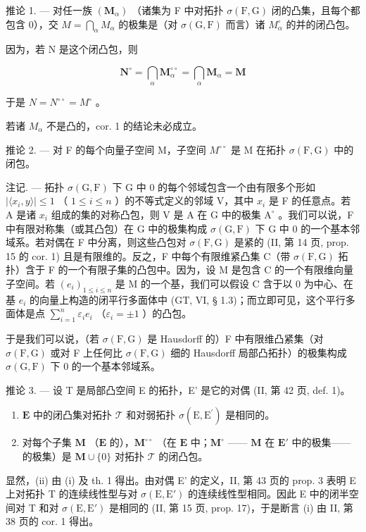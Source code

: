 推论 1. --- 对任一族 \((\mathbf{M}_{\alpha})\) （诸集为 F 中对拓扑 \(\sigma(\mathrm{F}, \mathrm{G})\) 闭的凸集，且每个都包含 0），交 \(M = \bigcap_{\alpha} M_{\alpha}\) 的极集是（对 \(\sigma(\mathrm{G}, \mathrm{F})\) 而言）诸 \(M_{\alpha}^{\circ}\) 的并的闭凸包。

因为，若 N 是这个闭凸包，则

\[
\mathbf {N} ^ {\circ} = \bigcap_ {\alpha} \mathbf {M} _ {\alpha} ^ {\circ \circ} = \bigcap_ {\alpha} \mathbf {M} _ {\alpha} = \mathbf {M}
\]

于是 \(N = N^{\circ\circ} = M^{\circ}\) 。

若诸 \(M_{\alpha}\) 不是凸的，cor. 1 的结论未必成立。

推论 2. --- 对 F 的每个向量子空间 M，子空间 \(M^{\circ\circ}\) 是 M 在拓扑 \(\sigma(\mathrm{F}, \mathrm{G})\) 中的闭包。

注记. --- 拓扑 \(\sigma(\mathrm{G},\mathrm{F})\) 下 G 中 0 的每个邻域包含一个由有限多个形如 \(|\langle x_i,y\rangle |\leqslant 1\) （ \(1\leqslant i\leqslant n\) ）的不等式定义的邻域 V，其中 \(x_{i}\) 是 F 的任意点。若 A 是诸 \(x_{i}\) 组成的集的对称凸包，则 V 是 A 在 G 中的极集 \(\mathrm{A}^{\circ}\) 。我们可以说，F 中有限对称集（或其凸包）在 G 中的极集构成 \(\sigma(\mathrm{G},\mathrm{F})\) 下 G 中 0 的一个基本邻域系。若对偶在 F 中分离，则这些凸包对 \(\sigma(\mathrm{F},\mathrm{G})\) 是紧的 (II, 第 14 页, prop. 15 的 cor. 1) 且是有限维的。反之，F 中每个有限维紧凸集 C（带 \(\sigma(\mathrm{F},\mathrm{G})\) 拓扑）含于 F 的一个有限子集的凸包中。因为，设 M 是包含 C 的一个有限维向量子空间。若 \((e_i)_{1\leqslant i\leqslant n}\) 是 M 的一个基，我们可以假设 C 含于以 0 为中心、在基 \(e_i\) 的向量上构造的闭平行多面体中 (GT, VI, § 1.3)；而立即可见，这个平行多面体是点 \(\sum_{i=1}^{n} \varepsilon_i e_i\) （\(\varepsilon_i = \pm 1\) ）的凸包。

于是我们可以说，（若 \(\sigma(\mathrm{F},\mathrm{G})\) 是 Hausdorff 的）F 中有限维凸紧集（对 \(\sigma(\mathrm{F},\mathrm{G})\) 或对 F 上任何比 \(\sigma(\mathrm{F},\mathrm{G})\) 细的 Hausdorff 局部凸拓扑）的极集构成 \(\sigma(\mathrm{G},\mathrm{F})\) 下 0 的一个基本邻域系。

推论 3. --- 设 T 是局部凸空间 E 的拓扑，E' 是它的对偶 (II, 第 42 页, def. 1)。

\begin{enumerate}
\def\labelenumi{(\roman{enumi})}
\item
  \(\mathbf{E}\) 中的闭凸集对拓扑 \(\mathcal{T}\) 和对弱拓扑 \(\sigma (\mathrm{E},\mathrm{E}^{\prime})\) 是相同的。
\item
  对每个子集 \(\mathbf{M}\) （\(\mathbf{E}\) 的），\(\mathbf{M}^{\circ \circ}\) （在 \(\mathbf{E}\) 中；\(\mathbf{M}^{\circ}\) —— \(\mathbf{M}\) 在 \(\mathbf{E}'\) 中的极集—— 的极集）是 \(\mathbf{M} \cup \{0\}\) 对拓扑 \(\mathcal{T}\) 的闭凸包。
\end{enumerate}

显然，(ii) 由 (i) 及 th. 1 得出。由对偶 E' 的定义，II, 第 43 页的 prop. 3 表明 E 上对拓扑 T 的连续线性型与对 \(\sigma(\mathrm{E}, \mathrm{E}')\) 的连续线性型相同。因此 E 中的闭半空间对 T 和对 \(\sigma(\mathrm{E}, \mathrm{E}')\) 是相同的 (II, 第 15 页, prop. 17)，于是断言 (i) 由 II, 第 38 页的 cor. 1 得出。

